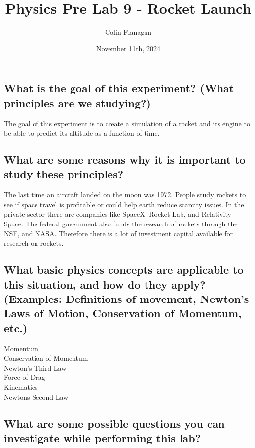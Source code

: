 \documentclass{article}
\title{Physics Pre Lab 9 - Rocket Launch}
\author{Colin Flanagan}
\date{November 11th, 2024}
\begin{document}
\maketitle

\subsection*{What is the goal of this experiment? (What principles are we studying?)}

    The goal of this experiment is to create a simulation of a rocket and its engine to be able to predict its altitude as a function of time.
    

\subsection*{What are some reasons why it is important to study these principles?
}

   The last time an aircraft landed on the moon was 1972. People study rockets to see if space travel is profitable or could help earth reduce scarcity issues. In the private sector there are companies like SpaceX, Rocket Lab, and Relativity Space. The federal government also funds the research of rockets through the NSF, and NASA. Therefore there is a lot of investment capital available for research on rockets.
    
\subsection*{What basic physics concepts are applicable to this situation, and how do they apply? (Examples: Definitions of movement, Newton’s Laws of Motion, Conservation of Momentum, etc.)}

    Momentum\\

    Conservation of Momentum\\

    Newton's Third Law\\

    Force of Drag\\

    Kinematics\\

    Newtons Second Law\\

\subsection*{What are some possible questions you can investigate while performing this lab?
}
\end{document}
